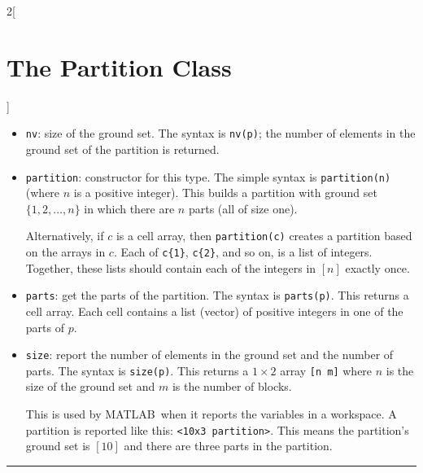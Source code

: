 \documentclass{amsart}
\newcommand\matlab{MATLAB}
\begin{document}
\begin{multicols}{2}[\section{The Partition Class}]
\begin{itemize}
\item \verb|nv|: size of the ground set. The syntax is \verb|nv(p)|;
  the number of elements in the ground set of the partition is
  returned. 
  
\item \verb|partition|: constructor for this type. The simple syntax
  is \verb|partition(n)| (where $n$ is a positive integer). This
  builds a partition with ground set $\{1,2,\ldots,n\}$ in which there
  are $n$ parts (all of size one).

  Alternatively, if $c$ is a cell array, then \verb|partition(c)|
  creates a partition based on the arrays in $c$. Each of \verb|c{1}|,
  \verb|c{2}|, and so on, is a list of integers. Together, these lists
  should contain each of the integers in $[n]$ exactly once.

\item \verb|parts|: get the parts of the partition. The syntax is
  \verb|parts(p)|. This returns a cell array. Each cell contains a
  list (vector) of positive integers in one of the parts of $p$. 



\item \verb|size|: report the number of elements in the ground set and
  the number of parts. The syntax is \verb|size(p)|. This returns a
  $1\times2$ array \verb|[n m]| where $n$ is the size of the ground
  set and $m$ is the number of blocks. 

  This is used by \matlab\ when it reports the variables in a
  workspace. A partition is reported like this:
  \verb|<10x3 partition>|. This means the partition's ground set is
  $[10]$ and there are three parts in the partition. 


\end{itemize}


\end{multicols}
\hrule
\end{document}
